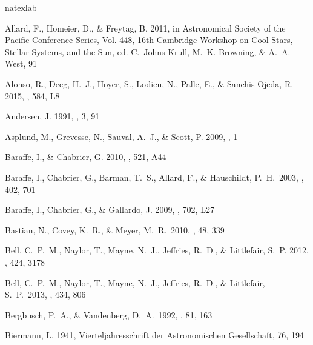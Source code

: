 
\renewcommand{\refname}{\bf\large 7. References} 

\begin{thebibliography}{56}
\expandafter\ifx\csname natexlab\endcsname\relax\def\natexlab#1{#1}\fi

{Allard}, F., {Homeier}, D., \& {Freytag}, B. 2011, in Astronomical Society of
  the Pacific Conference Series, Vol. 448, 16th Cambridge Workshop on Cool
  Stars, Stellar Systems, and the Sun, ed. C.~{Johns-Krull}, M.~K. {Browning},
  \& A.~A. {West}, 91
  
{Alonso}, R., {Deeg}, H.~J., {Hoyer}, S., {Lodieu}, N., {Palle}, E., \&
  {Sanchis-Ojeda}, R. 2015, \aap, 584, L8

{Andersen}, J. 1991, \aapr, 3, 91

{Asplund}, M., {Grevesse}, N., {Sauval}, A.~J., \& {Scott}, P. 2009, \araa, 1

{Baraffe}, I., \& {Chabrier}, G. 2010, \aap, 521, A44

 Baraffe, I., Chabrier, G., Barman, T.~S., Allard, F., \& Hauschildt, P.~H.\ 2003, \aap, 402, 701

Baraffe, I., Chabrier, G., \& Gallardo, J. 2009, \apj, 702, L27

 Bastian, N., Covey, K.~R., \& Meyer, M.~R.\ 2010, \araa, 48, 339

{Bell}, C.~P.~M., {Naylor}, T., {Mayne}, N.~J., {Jeffries}, R.~D., \&
  {Littlefair}, S.~P. 2012, \mnras, 424, 3178
  
 Bell, C.~P.~M., Naylor, T., Mayne, N.~J., Jeffries, R.~D., \& Littlefair, S.~P.\ 2013, \mnras, 434, 806
  
 Bergbusch, P.~A., \& Vandenberg, D.~A.\ 1992, \apjs, 81, 163 

{Biermann}, L. 1941, Vierteljahresschrift der Astronomischen Gesellschaft, 76,
  194
  

\end{thebibliography}
